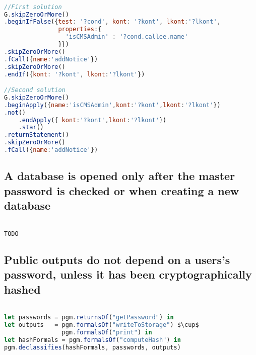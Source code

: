 \begin{lstlisting}[label={lst:Policy4JSQL},language=JavaScript,caption=Policy 4 in JS-QL]  % float=t?

//First solution
G.skipZeroOrMore()
.beginIfFalse({test: '?cond', kont: '?kont', lkont:'?lkont', 
               properties:{
                 'isCMSAdmin' : '?cond.callee.name'
               }})
.skipZeroOrMore()
.fCall({name:'addNotice'})
.skipZeroOrMore()
.endIf({kont: '?kont', lkont:'?lkont'})

//Second solution
G.skipZeroOrMore()
.beginApply({name:'isCMSAdmin',kont:'?kont',lkont:'?lkont'})
.not()
    .endApply({ kont:'?kont',lkont:'?lkont'})
    .star()
.returnStatement()
.skipZeroOrMore()
.fCall({name:'addNotice'})

\end{lstlisting}


\subsection{A database is opened only after the master password
is checked or when creating a new database}

\begin{lstlisting}[label={lst:Policy5PidginQL},language=JavaScript,caption=Policy 5 in PidginQL,mathescape=true]  % float=t?

TODO
\end{lstlisting}

\subsection{Public outputs do not depend on a users's password, unless it has been cryptographically hashed}

\begin{lstlisting}[label={lst:Policy6PidginQL},language=JavaScript,caption=Policy 6 in PidginQL,mathescape=true]  % float=t?

let passwords = pgm.returnsOf("getPassword") in 
let outputs   = pgm.formalsOf("writeToStorage") $\cup$
                pgm.formalsOf("print") in
let hashFormals = pgm.formalsOf("computeHash") in
pgm.declassifies(hashFormals, passwords, outputs)
\end{lstlisting}

